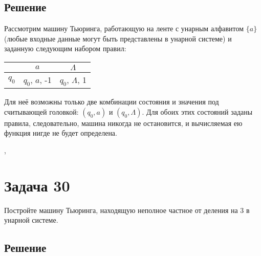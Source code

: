 \documentclass[a4paper,12pt]{article}
\begin{document}
	\subsection*{Решение}
    Рассмотрим машину Тьюринга, работающую на ленте с унарным алфавитом $\{a\}$ (любые входные данные могут быть представлены в унарной системе) и заданную следующим набором правил:
    \begin{center}
    \begin{tabular}{c||c|c}
         & {\boldmath $a$} &{\boldmath  $\Lambda$} \\
         \hline
         \hline
        {\boldmath $q_0$} & $q_0$, $a$, -1 & $q_0$, $\Lambda$, 1 \\
    \end{tabular}
    \end{center}
    Для неё возможны только две комбинации состояния и значения под считывающей головкой: $(q_0, a)$ и $(q_0, \Lambda)$. Для обоих этих состояний заданы правила, следовательно, машина никогда не остановится, и вычисляемая ею функция нигде не будет определена.
    
    \sep
    
    \section*{Задача 30}
    Постройте машину Тьюринга, находящую неполное частное от деления на $3$ в унарной системе.
    \subsection*{Решение}
	
\end{document}
